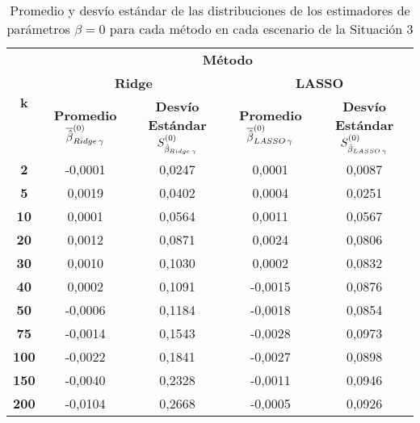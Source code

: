 \documentclass[a4paper,12pt]{report}
\begin{document}
\begin{table}[H]
\centering
\caption{Promedio y desvío estándar de las distribuciones de los estimadores de parámetros $\beta=0$ para cada método en cada escenario de la Situación 3}
\label{tab: sit 3 B 0 med std}
\footnotesize
\begin{tabular}{c|cc|cc}
\multirow{3}{*}[-2em]{\textbf{k}} & \multicolumn{4}{c}{\textbf{Método}} \\[2ex]
 & \multicolumn{2}{c}{\textbf{Ridge}} & \multicolumn{2}{c}{\textbf{LASSO}} \\[2ex]
 & \scriptsize\makecell{\textbf{Promedio} \\ $\overline{\hat{\beta}}_{Ridge \hspace{0.05cm} \gamma}^{(0)}$} & \scriptsize\makecell{\textbf{Desvío} \\ \textbf{Estándar} \\ $S_{\hat{\beta}_{Ridge \hspace{0.05cm} \gamma}}^{(0)}$} & \scriptsize\makecell{\textbf{Promedio} \\ $\overline{\hat{\beta}}_{LASSO \hspace{0.05cm} \gamma}^{(0)}$} & \scriptsize\makecell{\textbf{Desvío} \\ \textbf{Estándar} \\ $S_{\hat{\beta}_{LASSO \hspace{0.05cm} \gamma}}^{(0)}$} \\ \hline
\textbf{2} & -0,0001 & 0,0247 & \hspace{0.005cm} 0,0001 & 0,0087 \\
\textbf{5} & \hspace{0.005cm} 0,0019 & 0,0402 & \hspace{0.005cm} 0,0004 & 0,0251 \\
\textbf{10} & \hspace{0.005cm} 0,0001 & 0,0564 & \hspace{0.005cm} 0,0011 & 0,0567 \\
\textbf{20} & \hspace{0.005cm} 0,0012 & 0,0871 & \hspace{0.005cm} 0,0024 & 0,0806 \\
\textbf{30} & \hspace{0.005cm} 0,0010 & 0,1030 & \hspace{0.005cm} 0,0002 & 0,0832 \\
\textbf{40} & \hspace{0.005cm} 0,0002 & 0,1091 & -0,0015 & 0,0876 \\
\textbf{50} & -0,0006 & 0,1184 & -0,0018 & 0,0854 \\
\textbf{75} & -0,0014 & 0,1543 & -0,0028 & 0,0973 \\
\textbf{100} & -0,0022 & 0,1841 & -0,0027 & 0,0898 \\
\textbf{150} & -0,0040 & 0,2328 & -0,0011 & 0,0946 \\
\textbf{200} & -0,0104 & 0,2668 & -0,0005 & 0,0926
\end{tabular}
\end{table}
\end{document}
